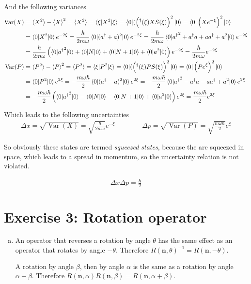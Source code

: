 \documentclass[a4paper,german,12pt,smallheadings]{scrartcl}
\begin{document}
\begin{enumerate}[a)]
    And the following variances
    \begin{align*}
      \operatorname{Var}(X)
      &= \braket{X^2} - \braket{X}^2
      = \braket{X^2}
      = \braket{\xi|X^2|\xi}
      = \braket{0|(\del{^\dagger(\xi)XS(\xi)}^2|0}
      = \braket{0|\del{Xe^{-\xi}}^2|0} \\
      &= \braket{0|X^2|0} e^{-2\xi}
      = \frac{\hbar}{2 m \omega} \braket{0|(a^\dagger + a)^2|0} e^{-2\xi}
      = \frac{\hbar}{2 m \omega} \braket{0|{a^\dagger}^2 + a^\dagger a + aa^\dagger + a^2|0} e^{-2\xi} \\
      &= \frac{\hbar}{2 m \omega} \del{\braket{0|{a^\dagger}^2|0} + \braket{0|N|0} + \braket{0|N+1|0} + \braket{0|a^2|0}} e^{-2\xi}
      = \frac{\hbar}{2 m \omega} e^{-2 \xi} \\
      \operatorname{Var}(P)
      &= \braket{P^2} - \braket{P}^2
      = \braket{P^2}
      = \braket{\xi|P^2|\xi}
      = \braket{0|(\del{^\dagger(\xi)PS(\xi)}^2|0}
      = \braket{0|\del{Pe^{\xi}}^2|0} \\
      &= \braket{0|P^2|0} e^{2\xi}
      = -\frac{m \omega \hbar}{2} \braket{0|(a^\dagger - a)^2|0} e^{2\xi}
      = -\frac{m \omega \hbar}{2} \braket{0|{a^\dagger}^2 - a^\dagger a - aa^\dagger + a^2|0} e^{2\xi} \\
      &= -\frac{m \omega \hbar}{2} \del{\braket{0|{a^\dagger}^2|0} - \braket{0|N|0} - \braket{0|N+1|0} + \braket{0|a^2|0}} e^{2\xi}
      = \frac{m \omega \hbar}{2} e^{2 \xi} \\
    \end{align*}

    Which leads to the following uncertainties
    \begin{align*}
      \Delta x = \sqrt{\operatorname{Var}(X)} = \sqrt{\frac{\hbar}{2 m \omega}} e^{-\xi}
      \qquad\qquad
      \Delta p = \sqrt{\operatorname{Var}(P)} = \sqrt{\frac{m \omega \hbar}{2}} e^{\xi}
    \end{align*}

    So obviously these states are termed \textit{squeezed states}, because the
    are squeezed in space, which leads to a spread in momentum, so the
    uncertainty relation is not violated.

    \begin{align*}
      \Delta x \Delta p = \frac{\hbar}{2}
    \end{align*}
\end{enumerate}
\section*{Exercise 3: Rotation operator}
\begin{enumerate}[a)]
  \item
     An operator that reverses a rotation by angle $\theta$ has the same effect
     as an operator that rotates by angle $-\theta$. Therefore
     $R(\mathbf{n},\theta)^{-1} = R(\mathbf{n},-\theta)$.

     A rotation by angle $\beta$, then by angle $\alpha$ is the same as a
     rotation by angle $\alpha + \beta$. Therefore $R(\mathbf{n}, \alpha) R(\mathbf{n}, \beta) =
     R(\mathbf{n}, \alpha + \beta)$.
\end{enumerate}
\end{document}
